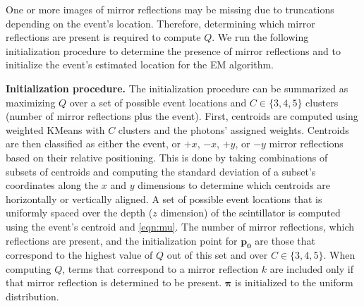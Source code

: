One or more images of mirror reflections may be missing due to truncations 
depending on the event's location.
Therefore, determining which mirror reflections are present is required to compute $Q$.
We run the following initialization procedure to determine the presence of mirror 
reflections and to initialize the event's estimated location for the EM algorithm.

\noindent
\textbf{Initialization procedure.}
The initialization procedure can be summarized as maximizing $Q$
over a set of possible event locations and $C \in \{3,4,5\}$ clusters 
(number of mirror reflections plus the event).
First, centroids are computed using weighted KMeans with $C$ clusters and the 
photons' assigned weights.
Centroids are then classified as either the event, or $+x$, $-x$, $+y$, or $-y$ 
mirror reflections based on their relative positioning.
This is done by taking combinations of subsets of centroids and computing the 
standard deviation of a subset's coordinates along the $x$ and $y$ dimensions to 
determine which centroids are horizontally or vertically aligned.
A set of possible event locations that is uniformly spaced over the depth 
($z$ dimension) of the scintillator is computed using the event's centroid and \cref{eqn:mu}.
The number of mirror reflections, which reflections are present, and the 
initialization point for $\bm{p_0}$ are those that correspond to the 
highest value of $Q$ out of this set and over $C \in \{3, 4, 5\}$.
When computing $Q$, terms that correspond to a mirror reflection $k$ are included
only if that mirror reflection is determined to be present.
$\bm{\pi}$ is initialized to the uniform distribution.
\iffalse
This initialization procedure is described in \cref{alg:init}.
$\bm{\pi}$ is initialized to the uniform distribution.


\begin{algorithm}
\caption{\textbf{Initialization procedure.}} \label{alg:init}
\DontPrintSemicolon
\SetKwInOut{Parameter}{Arguments}
\SetKwFunction{KMeans}{KMeans}
\SetKwFunction{ClassifyCentroids}{ClassifyCentroids}
\SetKwFunction{PossibleEventLocations}{PossibleEventLocations}
\SetKwFunction{Q}{Q}
\SetKwComment{Comment}{// }{}
\Parameter{photon locations $\bm{t}$, photon weights $\bm{w}$, lens to sensor distance $S_2$}
\KwOut{event initialization location $\bm{p_{init}}$, number of mirror reflections $K_{out}$, mirror reflection classification $M_{out}$}
$Q_{max} = -\infty$\;
\For{K=3:5}{
  $\bm{\mu_k}^0 \leftarrow \KMeans(\bm{t}, \bm{w}, K)$\;
  $M \leftarrow \ClassifyCentroids(\bm{\mu_k}^0)$\;
  $S \leftarrow \PossibleEventLocations(\bm{\mu_{event}}^0, S_2)$ \Comment{\cref{eqn:mu}}
  \For{$\bm{\tilde{p_0}} \in S$}{
    $Q_{\bm{\tilde{p_0}}} \leftarrow \Q(\bm{\tilde{p_0}})$\;
    \If{$Q_{\bm{\tilde{p_0}}} > Q_{max}$}{
      $Q_{max} \leftarrow Q_{\bm{\tilde{p_0}}}$\;
      $\bm{p_{init}} \leftarrow \bm{\tilde{p_0}}$\;
      $M_{out} \leftarrow M$\;
      $K_{out} \leftarrow K-1$\;
    }
  }
}
\end{algorithm}
\fi

